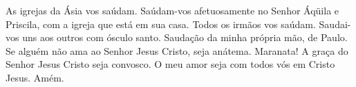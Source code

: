 As igrejas da Ásia vos saúdam. Saúdam-vos afetuosamente no Senhor
Áqüila e Priscila, com a igreja que está em sua casa. Todos
os irmãos vos saúdam. Saudai-vos uns aos outros com ósculo santo.
Saudação da minha própria mão, de Paulo. Se alguém não
ama ao Senhor Jesus Cristo, seja anátema. Maranata! A graça
do Senhor Jesus Cristo seja convosco. O meu amor seja com
todos vós em Cristo Jesus. Amém.

